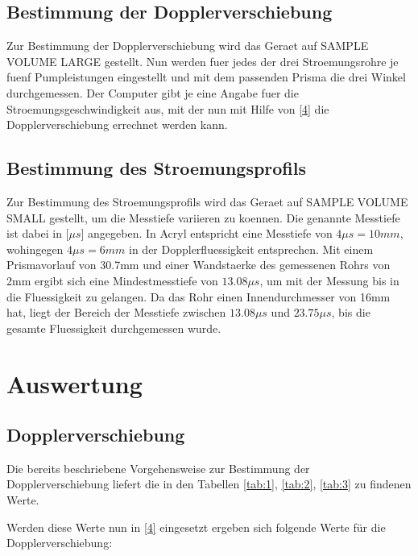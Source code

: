 \documentclass[titlepage=firstcover, captions=tableheading]{scrartcl}
\begin{document}
\subsection{Bestimmung der Dopplerverschiebung}
Zur Bestimmung der Dopplerverschiebung wird das Geraet auf SAMPLE VOLUME LARGE gestellt. Nun werden fuer jedes der drei Stroemungsrohre je fuenf Pumpleistungen eingestellt und mit dem passenden Prisma die drei Winkel durchgemessen. Der Computer gibt je eine Angabe fuer die Stroemungsgeschwindigkeit aus, mit der nun mit Hilfe von \ref{4} die Dopplerverschiebung errechnet werden kann.
\subsection{Bestimmung des Stroemungsprofils}
Zur Bestimmung des Stroemungsprofils wird das Geraet auf SAMPLE VOLUME SMALL gestellt, um die Messtiefe variieren zu koennen. Die genannte Messtiefe ist dabei in [$\mu s$] angegeben. In Acryl entspricht eine Messtiefe von $4\mu s=10mm$, wohingegen $4\mu s=6mm$ in der Dopplerfluessigkeit entsprechen. Mit einem Prismavorlauf von 30.7mm und einer Wandstaerke des gemessenen Rohrs von 2mm ergibt sich eine Mindestmesstiefe von $13.08\mu s$, um mit der Messung bis in die Fluessigkeit zu gelangen. Da das Rohr einen Innendurchmesser von 16mm hat, liegt der Bereich der Messtiefe zwischen $13.08\mu s$ und $23.75\mu s$, bis die gesamte Fluessigkeit durchgemessen wurde.

\section{Auswertung}

\subsection{Dopplerverschiebung}

Die bereits beschriebene Vorgehensweise zur Bestimmung der Dopplerverschiebung liefert die in den Tabellen \ref{tab:1}, \ref{tab:2}, \ref{tab:3} zu findenen Werte.

\noindent Werden diese Werte nun in \ref{4} eingesetzt ergeben sich folgende Werte für die Dopplerverschiebung:
\end{document}
